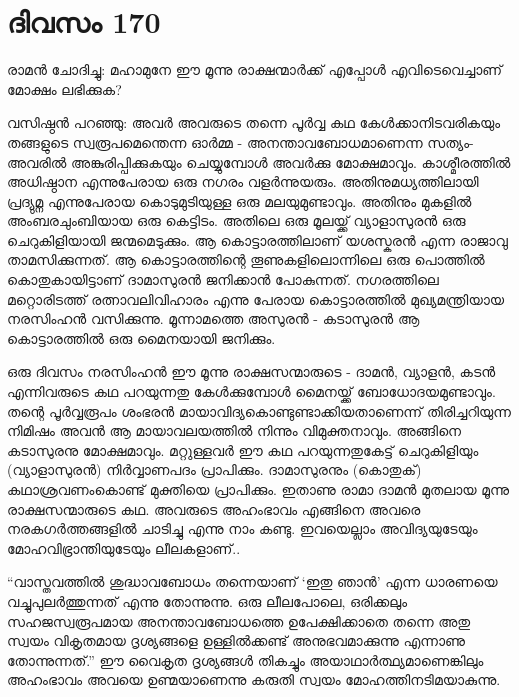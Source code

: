 \section{ദിവസം 170}


രാമൻ ചോദിച്ചു: മഹാമുനേ ഈ മൂന്നു രാക്ഷന്മാർക്ക് എപ്പോൾ എവിടെവെച്ചാണ്‌ മോക്ഷം ലഭിക്കുക?

വസിഷ്ഠൻ പറഞ്ഞു: അവർ അവരുടെ തന്നെ പൂർവ്വ കഥ കേൾക്കാനിടവരികയും തങ്ങളുടെ സ്വരൂപമെന്തെന്ന ഓർമ്മ - അനന്താവബോധമാണെന്ന സത്യം- അവരിൽ അങ്കുരിപ്പിക്കുകയും ചെയ്യുമ്പോൾ അവർക്കു മോക്ഷമാവും. കാശ്മീരത്തിൽ അധിഷ്ഠാന എന്നുപേരായ ഒരു നഗരം വളർന്നുയരും. അതിനുമധ്യത്തിലായി പ്രദ്യുമ്ന എന്നുപേരായ കൊടുമുടിയുള്ള ഒരു മലയുമുണ്ടാവും. അതിനും മുകളിൽ അംബരചുംബിയായ ഒരു കെട്ടിടം. അതിലെ ഒരു മൂലയ്ക്ക് വ്യാളാസുരൻ ഒരു ചെറുകിളിയായി ജന്മമെടുക്കും. ആ കൊട്ടാരത്തിലാണ്‌ യശസ്കരൻ എന്ന രാജാവു താമസിക്കുന്നത്. ആ കൊട്ടാരത്തിന്റെ തൂണുകളിലൊന്നിലെ ഒരു പൊത്തിൽ കൊതുകായിട്ടാണ്‌ ദാമാസുരൻ ജനിക്കാൻ പോകുന്നത്. നഗരത്തിലെ മറ്റൊരിടത്ത് രത്നാവലിവിഹാരം എന്നു പേരായ കൊട്ടാരത്തിൽ മുഖ്യമന്ത്രിയായ നരസിംഹൻ വസിക്കുന്നു. മൂന്നാമത്തെ അസുരൻ - കടാസുരൻ ആ കൊട്ടാരത്തിൽ ഒരു മൈനയായി ജനിക്കും.

ഒരു ദിവസം നരസിംഹൻ ഈ മൂന്നു രാക്ഷസന്മാരുടെ - ദാമൻ, വ്യാളൻ, കടൻ എന്നിവരുടെ കഥ പറയുന്നതു കേൾക്കുമ്പോൾ മൈനയ്ക്ക് ബോധോദയമുണ്ടാവും. തന്റെ പൂർവ്വരൂപം ശംഭരൻ മായാവിദ്യകൊണ്ടുണ്ടാക്കിയതാണെന്ന് തിരിച്ചറിയുന്ന നിമിഷം അവൻ ആ മായാവലയത്തിൽ നിന്നും വിമുക്തനാവും. അങ്ങിനെ കടാസുരനു മോക്ഷമാവും. മറ്റുള്ളവർ ഈ കഥ പറയുന്നതുകേട്ട് ചെറുകിളിയും (വ്യാളാസുരൻ) നിർവ്വാണപദം പ്രാപിക്കും. ദാമാസുരനും (കൊതുക്) കഥാശ്രവണംകൊണ്ട് മുക്തിയെ പ്രാപിക്കും. ഇതാണു രാമാ ദാമൻ മുതലായ മൂന്നു രാക്ഷസന്മാരുടെ കഥ. അവരുടെ അഹംഭാവം എങ്ങിനെ അവരെ നരകഗർത്തങ്ങളിൽ ചാടിച്ചു എന്നു നാം കണ്ടു. ഇവയെല്ലാം അവിദ്യയുടേയും മോഹവിഭ്രാന്തിയുടേയും ലീലകളാണ്‌..

“വാസ്തവത്തിൽ ശുദ്ധാവബോധം തന്നെയാണ്‌ ‘ഇതു ഞാൻ’ എന്ന ധാരണയെ വച്ചുപുലർത്തുന്നത് എന്നു തോന്നുന്നു. ഒരു ലീലപോലെ, ഒരിക്കലും സഹജസ്വരൂപമായ അനന്താവബോധത്തെ ഉപേക്ഷിക്കാതെ തന്നെ അതു സ്വയം വികൃതമായ ദൃശ്യങ്ങളെ ഉള്ളിൽക്കണ്ട് അനുഭവമാക്കുന്നു എന്നാണു തോന്നുന്നത്.” ഈ വൈകൃത ദൃശ്യങ്ങൾ തികച്ചും അയാഥാർത്ഥ്യമാണെങ്കിലും അഹംഭാവം അവയെ ഉണ്മയാണെന്നു കരുതി സ്വയം മോഹത്തിനടിമയാകുന്നു. 
